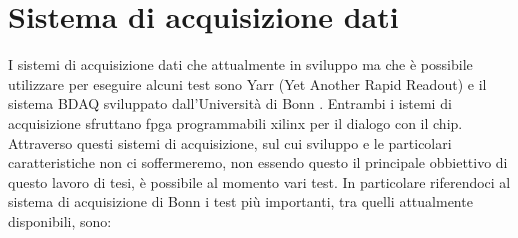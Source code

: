 \section{Sistema di acquisizione dati}
I sistemi di acquisizione dati che attualmente in sviluppo ma che è possibile utilizzare per eseguire alcuni test sono Yarr (Yet Another Rapid Readout) \cite{YARR} e il sistema BDAQ sviluppato dall'Università di Bonn \cite{BDAQ}. 
Entrambi i istemi di acquisizione sfruttano fpga programmabili xilinx per il dialogo con il chip. 
Attraverso questi sistemi di acquisizione, sul cui sviluppo e le particolari caratteristiche non ci soffermeremo, non essendo questo il principale obbiettivo di questo lavoro di tesi, è possibile al momento vari test. 
In particolare riferendoci al sistema di acquisizione di Bonn i test più importanti, tra quelli attualmente disponibili, sono:
